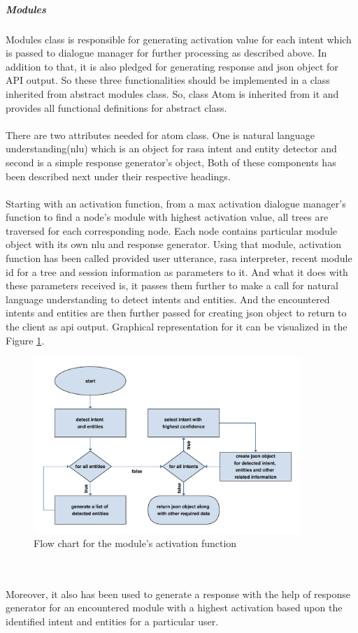 \subparagraph*{Modules} Modules class is responsible for generating activation value for each intent which is passed to dialogue manager for further processing as described above. In addition to that, it is also pledged for generating response and json object for API output. So these three functionalities should be implemented in a class inherited from abstract modules class. So, class Atom is inherited from it and provides all functional definitions for abstract class. 
\\~\\
There are two attributes needed for atom class. One is natural language understanding(nlu) which is an object for rasa intent and entity detector and second is a simple response generator's object, Both of these components has been described next under their respective headings. 
\\~\\
Starting with an activation function, from a max activation dialogue manager's function to find a node's module with highest activation value, all trees are traversed for each corresponding node. Each node contains particular module object with its own nlu and response generator. Using that module, activation function has been called provided user utterance, rasa interpreter, recent module id for a tree and session information as parameters to it. And what it does with these parameters received is, it passes them further to make a call for natural language understanding to detect intents and entities. And the encountered intents and entities are then further passed for creating json object to return to the client as api output. Graphical representation for it can be visualized in the Figure \ref{fig:flowModule}.

\begin{figure}[!h]
    \centering
    \includegraphics[width=0.9\textwidth]{img/module.pdf}
    \caption{Flow chart for the module's activation function}
    \label{fig:flowModule}
\end{figure}
\\~\\
Moreover, it also has been used to generate a response with the help of response generator for an encountered module with a highest activation based upon the identified intent and entities for a particular user.

